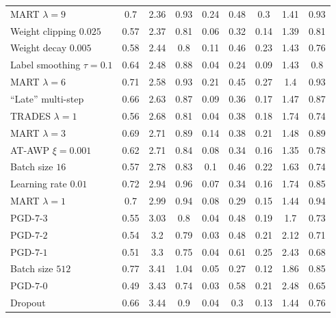 \begin{table}[t]
{\begin{tabularx}{\textwidth}{|X|c|c|c||c|c|c||c|c|}
		MART $\lambda{=}9$ & 0.7 & 2.36 & 0.93 & 0.24 & 0.48 & 0.3 & 1.41 & 0.93\\
		Weight clipping $0.025$ & 0.57 & 2.37 & 0.81 & 0.06 & 0.32 & 0.14 & 1.39 & 0.81\\
		Weight decay $0.005$ & 0.58 & 2.44 & 0.8 & 0.11 & 0.46 & 0.23 & 1.43 & 0.76\\
		Label smoothing $\tau{=}0.1$ & 0.64 & 2.48 & 0.88 & 0.04 & 0.24 & 0.09 & 1.43 & 0.8\\
		MART $\lambda{=}6$ & 0.71 & 2.58 & 0.93 & 0.21 & 0.45 & 0.27 & 1.4 & 0.93\\
		``Late'' multi-step & 0.66 & 2.63 & 0.87 & 0.09 & 0.36 & 0.17 & 1.47 & 0.87\\
		TRADES $\lambda{=}1$ & 0.56 & 2.68 & 0.81 & 0.04 & 0.38 & 0.18 & 1.74 & 0.74\\
		MART $\lambda{=}3$ & 0.69 & 2.71 & 0.89 & 0.14 & 0.38 & 0.21 & 1.48 & 0.89\\
		AT-AWP $\xi{=}0.001$ & 0.62 & 2.71 & 0.84 & 0.08 & 0.34 & 0.16 & 1.35 & 0.78\\
		Batch size $16$ & 0.57 & 2.78 & 0.83 & 0.1 & 0.46 & 0.22 & 1.63 & 0.74\\
		Learning rate $0.01$ & 0.72 & 2.94 & 0.96 & 0.07 & 0.34 & 0.16 & 1.74 & 0.85\\
		MART $\lambda{=}1$ & 0.7 & 2.99 & 0.94 & 0.08 & 0.29 & 0.15 & 1.44 & 0.94\\
		PGD-$7$-$3$ & 0.55 & 3.03 & 0.8 & 0.04 & 0.48 & 0.19 & 1.7 & 0.73\\
		PGD-$7$-$2$ & 0.54 & 3.2 & 0.79 & 0.03 & 0.48 & 0.21 & 2.12 & 0.71\\
		PGD-$7$-$1$ & 0.51 & 3.3 & 0.75 & 0.04 & 0.61 & 0.25 & 2.43 & 0.68\\
		Batch size $512$ & 0.77 & 3.41 & 1.04 & 0.05 & 0.27 & 0.12 & 1.86 & 0.85\\
		PGD-$7$-$0$ & 0.49 & 3.43 & 0.74 & 0.03 & 0.58 & 0.21 & 2.48 & 0.65\\
		Dropout & 0.66 & 3.44 & 0.9 & 0.04 & 0.3 & 0.13 & 1.44 & 0.76\\
		

\end{tabularx}}
\end{table}
